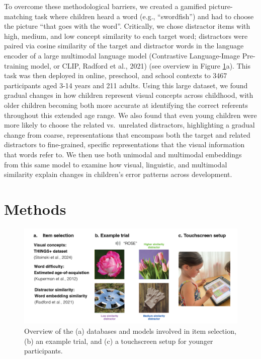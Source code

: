 \documentclass[
  man,floatsintext]{apa6}
\begin{document}
To overcome these methodological barriers, we created a gamified picture-matching task where children heard a word (e.g., ``swordfish'') and had to choose the picture ``that goes with the word''. Critically, we chose distractor items with high, medium, and low concept similarity to each target word; distractors were paired via cosine similarity of the target and distractor words in the language encoder of a large multimodal language model (Contrastive Language-Image Pre-training model, or CLIP, Radford et al., 2021) (see overview in Figure \ref{fig:procedure-figure}a). This task was then deployed in online, preschool, and school contexts to 3467 participants aged 3-14 years and 211 adults. Using this large dataset, we found gradual changes in how children represent visual concepts across childhood, with older children becoming both more accurate at identifying the correct referents throughout this extended age range. We also found that even young children were more likely to choose the related vs.~unrelated distractors, highlighting a gradual change from coarse, representations that encompass both the target and related distractors to fine-grained, specific representations that the visual information that words refer to. We then use both unimodal and multimodal embeddings from this same model to examine how visual, linguistic, and multimodal similarity explain changes in children's error patterns across development.

\section{Methods}\label{methods}

\begin{figure}[H]

{\centering \includegraphics[width=1\linewidth]{visvocab-overview} 

}

\caption{Overview of the (a) databases and models involved in item selection, (b) an example trial, and (c) a touchscreen setup for younger participants. }\label{fig:procedure-figure}
\end{figure}
\end{document}
